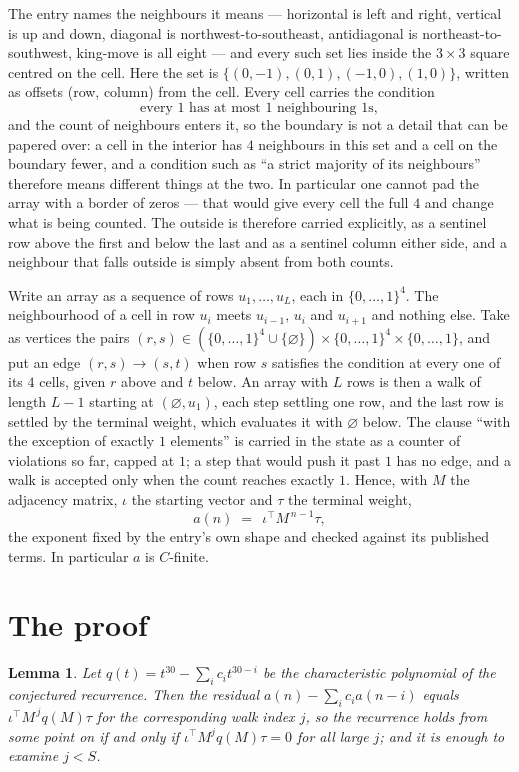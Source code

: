 \documentclass[11pt,a4paper]{article}
\theoremstyle{plain}
\newtheorem{lemma}[theorem]{Lemma}
\theoremstyle{definition}
\begin{document}
The entry names the neighbours it means --- horizontal is left and right, vertical is up and
down, diagonal is northwest-to-southeast, antidiagonal is northeast-to-southwest, king-move is
all eight --- and every such set lies inside the $3\times3$ square centred on the cell. Here
the set is $\{(0,-1), (0,1), (-1,0), (1,0)\}$, written as offsets (row, column) from the cell. Every cell carries
the condition
\[
\text{every 1 has at most 1 neighbouring 1s},
\]
and the count of neighbours enters it, so the boundary is not a detail that can be papered
over: a cell in the interior has $4$ neighbours in this set and a cell on the boundary
fewer, and a condition such as ``a strict majority of its neighbours'' therefore means
different things at the two. In particular one cannot pad the array with a border of zeros ---
that would give every cell the full $4$ and change what is being counted. The outside is
therefore carried
explicitly, as a sentinel row above the first and below the last and as a sentinel column
either side, and a neighbour that falls outside is simply absent from both counts.

Write an array as a sequence of rows $u_1,\dots,u_L$, each in
$\{0,\dots,1\}^{4}$. The neighbourhood of a cell in row $u_i$ meets $u_{i-1}$,
$u_i$ and $u_{i+1}$ and nothing else. Take as vertices the pairs
$(r,s)\in(\{0,\dots,1\}^{4}\cup\{\varnothing\})\times\{0,\dots,1\}^{4} \times \{0,\dots,1\}$,
and put an edge $(r,s)\to(s,t)$ when row $s$ satisfies the condition at every one of its
$4$ cells, given $r$ above and $t$ below. An array with $L$ rows is then a walk of length
$L-1$ starting at $(\varnothing,u_1)$, each step settling one row, and the last row is
settled by the terminal weight, which evaluates it with $\varnothing$ below. The clause ``with the exception of exactly $1$ elements'' is carried in
the state as a counter of violations so far, capped at $1$; a step that would push it past
$1$ has no edge, and a walk is accepted only when the count reaches exactly $1$. Hence,
with $M$ the adjacency matrix, $\iota$ the starting vector and $\tau$ the terminal weight,
\[
a(n)\;=\;\,\iota^{\!\top}M^{\,n-1}\tau ,
\]
the exponent fixed by the entry's own shape and checked against its published terms. In
particular $a$ is $C$-finite.

\section{The proof}

\begin{lemma}\label{lem:crit}
Let $q(t)=t^{30}-\sum_i c_it^{30-i}$ be the characteristic polynomial of the
conjectured recurrence. Then the residual $a(n)-\sum_ic_ia(n-i)$ equals
$\iota^{\!\top}M^{\,j}q(M)\tau$ for the corresponding walk index $j$, so the
recurrence holds from some point on if and only if $\iota^{\!\top}M^{j}q(M)\tau=0$ for all
large $j$; and it is enough to examine $j<S$.
\end{lemma}
\end{document}
